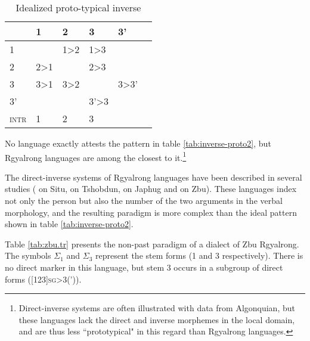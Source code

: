 \documentclass[twoside,a4paper,11pt]{article}
\newcommand{\grise}[1]{\cellcolor{lightgray}\textbf{#1}}
\newcommand{\ra}{$\Sigma_1$}
\newcommand{\rc}{$\Sigma_3$}
\begin{document}
\begin{table}[h]  \caption{Idealized proto-typical inverse} \label{tab:inverse-proto2}
\centering \label{tab:inv-proto2}
\begin{tabular}{l|lllll}
\toprule
&1 & 2 &3&3'\\
\hline
1 &\grise{} &1>2 \cellcolor[wave]{400}& 1>3\cellcolor[wave]{400}&\cellcolor[wave]{400} \\
2&2>1\cellcolor[wave]{500}&\grise{}&2>3 \cellcolor[wave]{400}&\cellcolor[wave]{400}\\
3&3>1\cellcolor[wave]{500}&3>2\cellcolor[wave]{500}&\grise{}&3>3'\cellcolor[wave]{400}\\
3'&\cellcolor[wave]{500}&\cellcolor[wave]{500}&3'>3\cellcolor[wave]{500}&\grise{}\\
\hline
\textsc{intr}&1&2&3\\
\bottomrule
\end{tabular}
\end{table}

No language exactly attests the pattern in table \ref{tab:inverse-proto2}, but Rgyalrong languages are among the closest to it.\footnote{Direct-inverse systems are often illustrated with data from Algonquian, but these languages lack the direct and inverse morphemes in the local domain, and are thus less ``prototypical" in this regard than Rgyalrong languages.} 


The direct-inverse systems of Rgyalrong languages have been described in several studies (\citealt{delancey81direction} on Situ,  \citealt{jackson02rentongdengdi} on Tshobdun,  \citealt{jacques10inverse} on Japhug and \citealt{gongxun12} on Zbu). These languages index not only the person but also the number of the two arguments in the verbal morphology, and the resulting paradigm is more complex than the ideal pattern shown in table \ref{tab:inverse-proto2}.


Table \ref{tab:zbu.tr} presents the non-past paradigm of a dialect of Zbu Rgyalrong. The symbols \ra{} and \rc{} represent the stem forms (1 and 3 respectively). There is no direct marker in this language, but stem 3 occurs in a subgroup of direct forms (\textsc{[123]\textsc{sg}>3(')}).%
\end{document}

